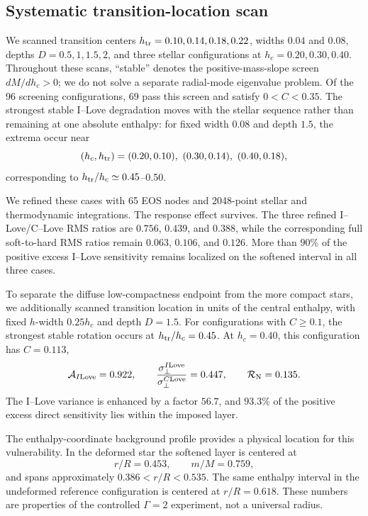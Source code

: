 \subsection{Systematic transition-location scan}

We scanned transition centers \(h_{\rm tr}=0.10,0.14,0.18,0.22\), widths \(0.04\) and \(0.08\), depths \(D=0.5,1,1.5,2\), and three stellar configurations at \(h_c=0.20,0.30,0.40\). Throughout these scans, ``stable'' denotes the positive-mass-slope screen \(dM/dh_c>0\); we do not solve a separate radial-mode eigenvalue problem. Of the 96 screening configurations, 69 pass this screen and satisfy \(0<C<0.35\). The strongest stable I--Love degradation moves with the stellar sequence rather than remaining at one absolute enthalpy: for fixed width \(0.08\) and depth \(1.5\), the extrema occur near
\begin{equation}
 (h_c,h_{\rm tr})
 =
 (0.20,0.10),\ (0.30,0.14),\ (0.40,0.18),
\end{equation}
corresponding to \(h_{\rm tr}/h_c\simeq0.45\)--0.50.

We refined these cases with 65 EOS nodes and 2048-point stellar and thermodynamic integrations. The response effect survives. The three refined I--Love/C--Love RMS ratios are \(0.756\), \(0.439\), and \(0.388\), while the corresponding full soft-to-hard RMS ratios remain \(0.063\), \(0.106\), and \(0.126\). More than \(90\%\) of the positive excess I--Love sensitivity remains localized on the softened interval in all three cases.

To separate the diffuse low-compactness endpoint from the more compact stars, we additionally scanned transition location in units of the central enthalpy, with fixed \(h\)-width \(0.25h_c\) and depth \(D=1.5\). For configurations with \(C\ge0.1\), the strongest stable rotation occurs at \(h_{\rm tr}/h_c=0.45\). At \(h_c=0.40\), this configuration has \(C=0.113\),
\begin{equation}
 {\cal A}_{I{\rm Love}}=0.922,\qquad
 \frac{\sigma_\perp^{I{\rm Love}}}{\sigma_\perp^{C{\rm Love}}}=0.447,\qquad
 \mathcal R_{\rm N}=0.135.
\end{equation}
The I--Love variance is enhanced by a factor \(56.7\), and \(93.3\%\) of the positive excess direct sensitivity lies within the imposed layer.

The enthalpy-coordinate background profile provides a physical location for this vulnerability. In the deformed star the softened layer is centered at
\begin{equation}
 r/R=0.453,\qquad m/M=0.759,
\end{equation}
and spans approximately \(0.386<r/R<0.535\). The same enthalpy interval in the undeformed reference configuration is centered at \(r/R=0.618\). These numbers are properties of the controlled \(\Gamma=2\) experiment, not a universal radius.

